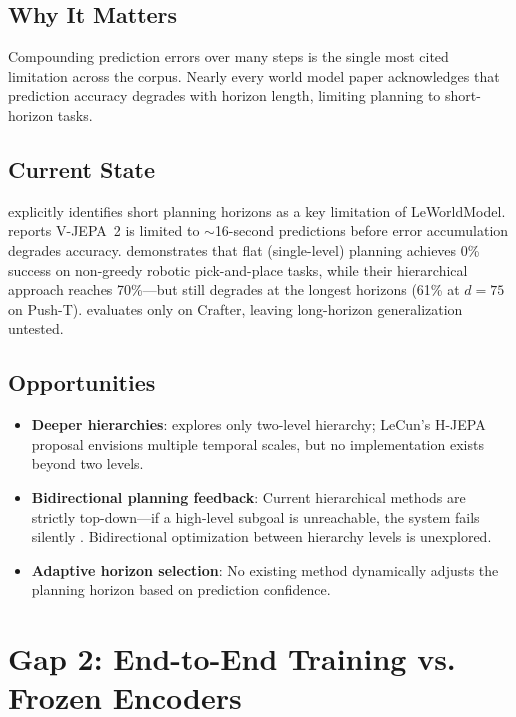 \documentclass[11pt,a4paper]{article}
\begin{document}
\subsection{Why It Matters}
Compounding prediction errors over many steps is the single most cited limitation across the corpus. Nearly every world model paper acknowledges that prediction accuracy degrades with horizon length, limiting planning to short-horizon tasks.

\subsection{Current State}
\citet{maes2026leworldmodel} explicitly identifies short planning horizons as a key limitation of LeWorldModel. \citet{assran2025vjepa2} reports V-JEPA~2 is limited to $\sim$16-second predictions before error accumulation degrades accuracy. \citet{zhang2026hierarchical} demonstrates that flat (single-level) planning achieves 0\% success on non-greedy robotic pick-and-place tasks, while their hierarchical approach reaches 70\%---but still degrades at the longest horizons (61\% at $d{=}75$ on Push-T). \citet{hauri2026dreamercdp} evaluates only on Crafter, leaving long-horizon generalization untested.

\subsection{Opportunities}
\begin{itemize}[noitemsep]
    \item \textbf{Deeper hierarchies}: \citet{zhang2026hierarchical} explores only two-level hierarchy; LeCun's H-JEPA proposal \citep{lecun2022path} envisions multiple temporal scales, but no implementation exists beyond two levels.
    \item \textbf{Bidirectional planning feedback}: Current hierarchical methods are strictly top-down---if a high-level subgoal is unreachable, the system fails silently \citep{zhang2026hierarchical}. Bidirectional optimization between hierarchy levels is unexplored.
    \item \textbf{Adaptive horizon selection}: No existing method dynamically adjusts the planning horizon based on prediction confidence.
\end{itemize}

\section{Gap 2: End-to-End Training vs. Frozen Encoders}
\end{document}
